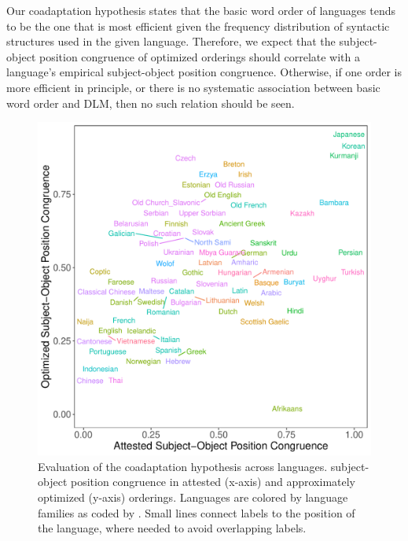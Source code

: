 \documentclass[9pt,twocolumn,twoside,lineno]{pnas-new}
\begin{document}
Our coadaptation hypothesis states that the basic word order of languages tends to be the one that is most efficient given the frequency distribution of syntactic structures used in the given language.
Therefore, we expect that the subject-object position congruence of optimized orderings should correlate with a language's empirical subject-object position congruence.
Otherwise, if one order is more efficient in principle, or there is no systematic association between basic word order and DLM, then no such relation should be seen.


\begin{figure}[h!]
    \centering
    \includegraphics[width=.8\textwidth]{../analysis/figures/fracion-optimized_DLM_2.6_format.pdf}
	\caption{Evaluation of the coadaptation hypothesis across languages. subject-object position congruence in attested (x-axis) and approximately optimized (y-axis) orderings. Languages are colored by language families as coded by \cite{zeman2020universal}. Small lines connect labels to the position of the language, where needed to avoid overlapping labels.} %
    \label{fig:study1}\label{fig:spoken}
\end{figure}
\end{document}
